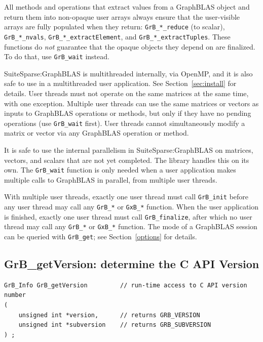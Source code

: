 All methods and operations that extract values from a GraphBLAS object and
return them into non-opaque user arrays always ensure that the user-visible
arrays are fully populated when they return: \verb'GrB_*_reduce' (to scalar),
\verb'GrB_*_nvals', \verb'GrB_*_extractElement', and
\verb'GrB_*_extractTuples'.  These functions do {\em not} guarantee that the
opaque objects they depend on are finalized.  To do that, use
\verb'GrB_wait' instead.

SuiteSparse:GraphBLAS is multithreaded internally, via OpenMP, and it is also
safe to use in a multithreaded user application.  See Section~\ref{sec:install}
for details.
User threads must not operate on the same matrices at the same time, with one
exception.  Multiple user threads can use the same matrices or vectors as
inputs to GraphBLAS operations or methods, but only if they have no
pending operations (use \verb'GrB_wait'
first).  User threads cannot simultaneously modify a matrix or vector via any
GraphBLAS operation or method.

It is safe to use the internal parallelism in SuiteSparse:GraphBLAS on
matrices, vectors, and scalars that are not yet completed.  The library
handles this on its own.  The \verb'GrB_wait' function is only
needed when a user application makes multiple calls to GraphBLAS in parallel,
from multiple user threads.

With multiple user threads, exactly one user thread must call \verb'GrB_init'
before any user thread may call any \verb'GrB_*' or \verb'GxB_*' function.
When the user application is finished, exactly one user thread must call
\verb'GrB_finalize', after which no user thread may call any \verb'GrB_*' or
\verb'GxB_*' function.
The mode of a GraphBLAS session can be queried with \verb'GrB_get';
see Section~\ref{options} for details.

\newpage
\subsection{{\sf GrB\_getVersion:} determine the C API Version} %
\label{getVersion}

\begin{mdframed}[userdefinedwidth=6in]
{\footnotesize
\begin{verbatim}
GrB_Info GrB_getVersion         // run-time access to C API version number
(
    unsigned int *version,      // returns GRB_VERSION
    unsigned int *subversion    // returns GRB_SUBVERSION
) ;
\end{verbatim}
}\end{mdframed}


